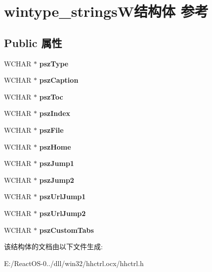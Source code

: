 \hypertarget{structwintype__strings_w}{}\section{wintype\+\_\+strings\+W结构体 参考}
\label{structwintype__strings_w}
\subsection*{Public 属性}
\begin{DoxyCompactItemize}
\item 
\mbox{\label{structwintype__strings_w_af405110f69d0973de2781cf6e5ea8cef}} 
W\+C\+H\+AR $\ast$ {\bfseries psz\+Type}
\item 
\mbox{\label{structwintype__strings_w_abbbd58cadf95553e62e98f0c555a4276}} 
W\+C\+H\+AR $\ast$ {\bfseries psz\+Caption}
\item 
\mbox{\label{structwintype__strings_w_ab40642c41f717246c123106b13246bd3}} 
W\+C\+H\+AR $\ast$ {\bfseries psz\+Toc}
\item 
\mbox{\label{structwintype__strings_w_afaab9a50656c5be154d3b998687f910e}} 
W\+C\+H\+AR $\ast$ {\bfseries psz\+Index}
\item 
\mbox{\label{structwintype__strings_w_ad661c75b1da2b6772958df3b98615a7e}} 
W\+C\+H\+AR $\ast$ {\bfseries psz\+File}
\item 
\mbox{\label{structwintype__strings_w_a80bfa01d91e961004ac4e120023b5e3b}} 
W\+C\+H\+AR $\ast$ {\bfseries psz\+Home}
\item 
\mbox{\label{structwintype__strings_w_a7888ffd44ceaef312555ab33c074e0ed}} 
W\+C\+H\+AR $\ast$ {\bfseries psz\+Jump1}
\item 
\mbox{\label{structwintype__strings_w_ad9bdf3fd810095fc0bd1b63a406c5130}} 
W\+C\+H\+AR $\ast$ {\bfseries psz\+Jump2}
\item 
\mbox{\label{structwintype__strings_w_a12d29d789dc0c42d394452976232f3f3}} 
W\+C\+H\+AR $\ast$ {\bfseries psz\+Url\+Jump1}
\item 
\mbox{\label{structwintype__strings_w_a65463a532f54719e840cbc6df69d432b}} 
W\+C\+H\+AR $\ast$ {\bfseries psz\+Url\+Jump2}
\item 
\mbox{\label{structwintype__strings_w_a94926510b8596471dccd2ba15e705cb6}} 
W\+C\+H\+AR $\ast$ {\bfseries psz\+Custom\+Tabs}
\end{DoxyCompactItemize}


该结构体的文档由以下文件生成\+:\begin{DoxyCompactItemize}
\item 
E\+:/\+React\+O\+S-\/0../dll/win32/hhctrl.\+ocx/hhctrl.\+h\end{DoxyCompactItemize}
